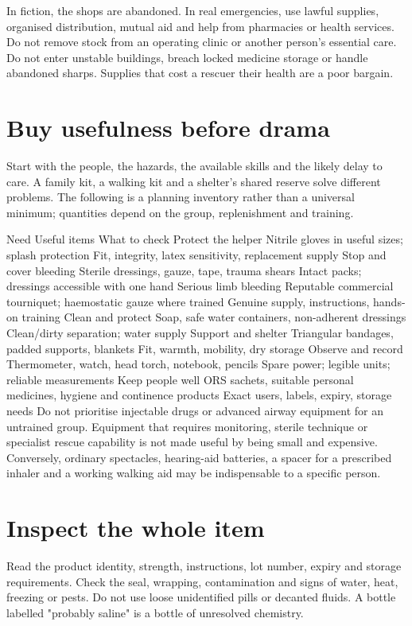 \documentclass[10pt,openright]{book}
\begin{document}
In fiction, the shops are abandoned. In real emergencies, use lawful supplies, organised distribution, mutual aid and help from pharmacies or health services. Do not remove stock from an operating clinic or another person's essential care. Do not enter unstable buildings, breach locked medicine storage or handle abandoned sharps. Supplies that cost a rescuer their health are a poor bargain.

\section*{Buy usefulness before drama}
Start with the people, the hazards, the available skills and the likely delay to care. A family kit, a walking kit and a shelter's shared reserve solve different problems. The following is a planning inventory rather than a universal minimum; quantities depend on the group, replenishment and training.

Need Useful items What to check Protect the helper Nitrile gloves in useful sizes; splash protection Fit, integrity, latex sensitivity, replacement supply Stop and cover bleeding Sterile dressings, gauze, tape, trauma shears Intact packs; dressings accessible with one hand Serious limb bleeding Reputable commercial tourniquet; haemostatic gauze where trained Genuine supply, instructions, hands-on training Clean and protect Soap, safe water containers, non-adherent dressings Clean/dirty separation; water supply Support and shelter Triangular bandages, padded supports, blankets Fit, warmth, mobility, dry storage Observe and record Thermometer, watch, head torch, notebook, pencils Spare power; legible units; reliable measurements Keep people well ORS sachets, suitable personal medicines, hygiene and continence products Exact users, labels, expiry, storage needs Do not prioritise injectable drugs or advanced airway equipment for an untrained group. Equipment that requires monitoring, sterile technique or specialist rescue capability is not made useful by being small and expensive. Conversely, ordinary spectacles, hearing-aid batteries, a spacer for a prescribed inhaler and a working walking aid may be indispensable to a specific person.

\section*{Inspect the whole item}
Read the product identity, strength, instructions, lot number, expiry and storage requirements. Check the seal, wrapping, contamination and signs of water, heat, freezing or pests. Do not use loose unidentified pills or decanted fluids. A bottle labelled "probably saline" is a bottle of unresolved chemistry.
\end{document}
